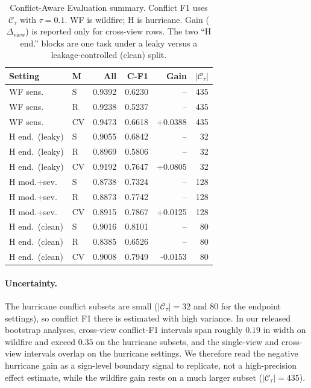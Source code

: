 \documentclass[sigconf]{acmart}
\newcommand{\conf}{\mathcal{C}_{\tau}}
\newcommand{\dview}{\Delta_{\mathrm{view}}}
\begin{document}
\begin{table}[t]
  \caption{Conflict-Aware Evaluation summary. Conflict F1 uses $\conf$ with
  $\tau=0.1$. WF is wildfire; H is hurricane. Gain ($\dview$) is reported only
  for cross-view rows. The two ``H end.'' blocks are one task under a leaky
  versus a leakage-controlled (clean) split.}
  \label{tab:cae}
  \centering
  \scriptsize
  \setlength{\tabcolsep}{2.6pt}
  \begin{tabular}{llrrrr}
    \toprule
    Setting & M & All & C-F1 & Gain & $|\conf|$ \\
    \midrule
    WF sens.        & S  & 0.9392 & 0.6230 & --      & 435 \\
    WF sens.        & R  & 0.9238 & 0.5237 & --      & 435 \\
    WF sens.        & CV & 0.9473 & 0.6618 & +0.0388 & 435 \\
    \midrule
    H end.\ (leaky) & S  & 0.9055 & 0.6842 & --      & 32  \\
    H end.\ (leaky) & R  & 0.8969 & 0.5806 & --      & 32  \\
    H end.\ (leaky) & CV & 0.9192 & 0.7647 & +0.0805 & 32  \\
    \midrule
    H mod.+sev.     & S  & 0.8738 & 0.7324 & --      & 128 \\
    H mod.+sev.     & R  & 0.8873 & 0.7742 & --      & 128 \\
    H mod.+sev.     & CV & 0.8915 & 0.7867 & +0.0125 & 128 \\
    \midrule
    H end.\ (clean) & S  & 0.9016 & 0.8101 & --      & 80  \\
    H end.\ (clean) & R  & 0.8385 & 0.6526 & --      & 80  \\
    H end.\ (clean) & CV & 0.9008 & 0.7949 & -0.0153 & 80  \\
    \bottomrule
  \end{tabular}
\end{table}

\paragraph{Uncertainty.}
The hurricane conflict subsets are small ($|\conf|=32$ and $80$ for the endpoint
settings), so conflict F1 there is estimated with high variance. In our released
bootstrap analyses, cross-view conflict-F1 intervals span roughly $0.19$ in
width on wildfire and exceed $0.35$ on the hurricane subsets, and the
single-view and cross-view intervals overlap on the hurricane settings. We
therefore read the negative hurricane gain as a sign-level boundary signal to
replicate, not a high-precision effect estimate, while the wildfire gain rests
on a much larger subset ($|\conf|=435$).
\end{document}
